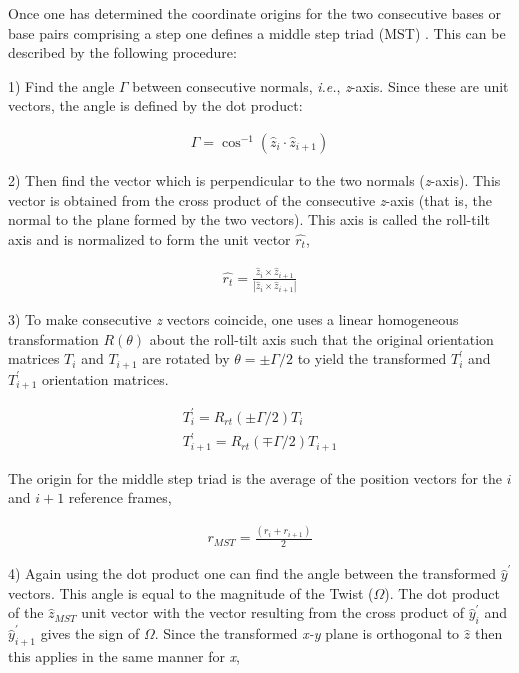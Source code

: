Once one has determined the coordinate origins for the two consecutive
bases or base pairs comprising a  step one defines a middle step triad
(MST) \cite{lu1997}. This can be described by the following procedure:

1) Find the angle $\Gamma$ between consecutive normals, \textit{i.e.},
\textit{z}-axis. Since these are unit vectors, the angle is defined by
the dot product:

\begin{gather}
\Gamma = \cos^{-1} (\hat{z}_i \cdot \hat{z}_{i+1})
\end{gather}

2)  Then find the  vector which  is perpendicular  to the  two normals
(\textit{z}-axis). This  vector is obtained from the  cross product of
the  consecutive \textit{z}-axis  (that is,  the normal  to  the plane
formed by the two vectors). This axis is called the roll-tilt axis and
is normalized to form the unit vector $\hat{r_t}$,

\begin{gather}
\hat{r_t} = \frac{\hat{z}_i \times \hat{z}_{i+1}}{|\hat{z}_i \times
\hat{z}_{i+1}|}
\end{gather}

3) To make consecutive \textit{z}  vectors coincide, one uses a linear
homogeneous transformation  $R(\theta)$ about the  roll-tilt axis such
that the original orientation matrices $T_i$ and $T_{i+1}$ are rotated
by $ \theta  = \pm \Gamma / 2$ to yield  the transformed $T_i^{'}$ and
$T_{i+1}^{'}$ orientation matrices.

\begin{gather}
T_i^{'} = R_{rt}(\pm \Gamma/2) T_{i} \\
T_{i+1}^{'} = R_{rt}(\mp \Gamma/2) T_{i+1}
\end{gather}

The origin  for the middle step  triad is the average  of the position
vectors for the $i$ and $i+1$ reference frames,

\begin{gather}
r_{MST} = \frac{(r_i + r_{i+1})} {2}
\end{gather}

4) Again  using the  dot product  one can find  the angle  between the
transformed  $\hat{y}^{'}$  vectors.   This  angle  is  equal  to  the
magnitude  of   the  Twist  ($\Omega$).    The  dot  product   of  the
$\hat{z}_{MST}$ unit  vector with the vector resulting  from the cross
product of $\hat{y}_{i}^{'}$ and $\hat{y}_{i+1}^{'}$ gives the sign of
$\Omega$. Since  the transformed  \textit{x-y} plane is  orthogonal to
$\hat{z}$ then this applies in the same manner for \textit{x},

